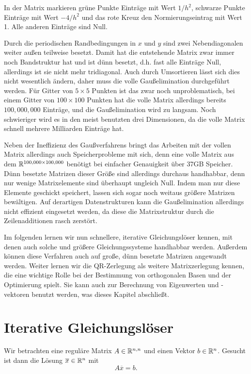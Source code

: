 In der Matrix markieren grüne Punkte Einträge mit Wert $1/h^2$,
schwarze Punkte Einträge mit Wert $-4/h^2$ und das rote Kreuz den
Normierungseintrag mit Wert 1. Alle anderen Einträge sind Null.

Durch die periodischen Randbedingungen in $x$ und $y$ sind zwei
Nebendiagonalen weiter außen teilweise besetzt. Damit hat die
entstehende Matrix zwar immer noch Bandstruktur hat und ist dünn
besetzt, d.h. fast alle Einträge Null, allerdings ist sie nicht mehr
tridiagonal. Auch durch Umsortieren lässt sich dies nicht wesentlich
ändern, daher muss die volle Gaußelimination durchgeführt werden. Für
Gitter von $5\times 5$ Punkten ist das zwar noch unproblematisch, bei
einem Gitter von $100\times 100$ Punkten hat die volle Matrix
allerdings bereits $100,000,000$ Einträge, und die Gaußelimination
wird zu langsam. Noch schwieriger wird es in den meist benutzten
drei Dimensionen, da die volle Matrix schnell mehrere Milliarden
Einträge hat.

Neben der Ineffizienz des Gaußverfahrens bringt das Arbeiten mit der
vollen Matrix allerdings auch Speicherprobleme mit sich, denn eine
volle Matrix aus dem $\mathbb{R}^{100,000\times 100,000}$ benötigt bei
einfacher Genauigkeit über 37GB Speicher. Dünn besetzte Matrizen
dieser Größe sind allerdings durchaus handhabbar, denn nur wenige
Matrixelemente sind überhaupt ungleich Null. Indem man nur diese
Elemente geschickt speichert, lassen sich sogar noch weitaus größere
Matrizen bewältigen. Auf derartigen Datenstrukturen kann die
Gaußelimination allerdings nicht effizient eingesetzt werden, da diese
die Matrixstruktur durch die Zeilenadditionen rasch zerstört.

Im folgenden lernen wir nun schnellere, iterative Gleichungslöser
kennen, mit denen auch solche und größere Gleichungssysteme handhabbar
werden. Außerdem können diese Verfahren auch auf große, dünn besetzte
Matrizen angewandt werden. Weiter lernen wir die QR-Zerlegung als
weitere Matrixzerlegung kennen, die eine wichtige Rolle bei der
Bestimmung von orthogonalen Basen und der 
Optimierung spielt. Sie kann auch zur Berechnung von Eigenwerten und
-vektoren benutzt werden, was dieses Kapitel abschließt.

\section{Iterative Gleichungslöser}

Wir betrachten eine reguläre Matrix $A\in\mathbb{R}^{n,n}$ und einen Vektor
$b\in\mathbb{R}^n$. Gesucht ist dann die Lösung $\overline{x}\in\mathbb{R}^n$ mit
\begin{equation}
  \label{eq:axb}
  A\overline{x} = b.
\end{equation}

